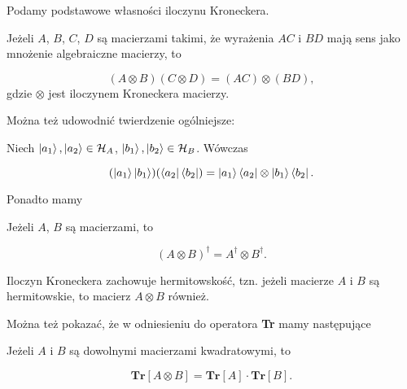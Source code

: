 Podamy podstawowe własności iloczynu Kroneckera.

\begin{theorem}
    Jeżeli $A$, $B$, $C$, $D$ są macierzami takimi, że wyrażenia $A C$ i $B D$ mają sens jako mnożenie algebraiczne macierzy, to

    \begin{equation}
        (A \otimes B) (C \otimes D) = (A C) \otimes (B D),
    \end{equation}
    gdzie $\otimes$ jest iloczynem Kroneckera macierzy.
\end{theorem}

Można też udowodnić twierdzenie ogólniejsze:

\begin{theorem}
    \label{theorem:generic}
    Niech $\ket{a_{1}}, \ket{a_{2}} \in \mathcal{H}_{A}$, $\ket{b_{1}}, \ket{b_{2}} \in \mathcal{H}_{B}$. Wówczas

    \begin{equation}
        (\ket{a_{1}} \ket{b_{1}}) (\bra{a_{2}} \bra{b_{2}}) = \ket{a_{1}} \bra{a_{2}} \otimes \ket{b_{1}} \bra{b_{2}}.
    \end{equation}
\end{theorem}

Ponadto mamy

\begin{theorem}
    Jeżeli $A$, $B$ są macierzami, to

    \begin{equation}
        (A \otimes B) ^ {\dag} = A ^ \dag \otimes B ^ \dag.
    \end{equation}
\end{theorem}

\begin{corollary}
    Iloczyn Kroneckera zachowuje hermitowskość, tzn. jeżeli macierze $A$ i $B$ są hermitowskie, to macierz $A \otimes B$ również.
\end{corollary}

Można też pokazać, że w odniesieniu do operatora \textbf{Tr} mamy następujące

\begin{theorem}
    Jeżeli $A$ i $B$ są dowolnymi macierzami kwadratowymi, to

    \begin{equation}
        \textbf{Tr}[A \otimes B] = \textbf{Tr}[A] \cdot \textbf{Tr}[B].
    \end{equation}
\end{theorem}

